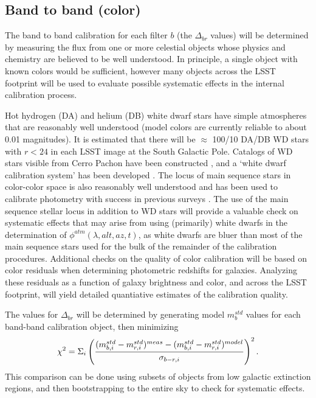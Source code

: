 \documentclass[12pt,preprint]{aastex}
\begin{document}
\subsection{Band to band (color)}

The band to band calibration for each filter $b$ (the $\Delta_{br}$
values) will be determined by measuring the flux from one or more
celestial objects whose physics and chemistry are believed to be well
understood. In principle, a single object with known colors would be
sufficient, however many objects across the LSST footprint
will be used to evaluate possible systematic effects in the internal
calibration process. 

Hot hydrogen (DA) and helium (DB) white dwarf stars have simple
atmospheres that are reasonably well understood (model colors are
currently reliable to about 0.01 magnitudes). It is estimated that
there will be $\approx$ 100/10 DA/DB WD stars with $r<24$ in each LSST
image at the South Galactic Pole. Catalogs of WD stars visible from
Cerro Pachon have been constructed \citep{1992JRASC..86..309B,
2004AJ....128.3053B}, and a `white dwarf calibration system' has been
developed \citep{2006AJ....132.1221H}. The locus of main sequence
stars in color-color space is also reasonably well understood and has
been used to calibrate photometry with success in previous surveys
\citep{2004MNRAS.352.1255M, 2007AJ....134..973I}. The use of the main
sequence stellar locus in addition to WD stars will provide a valuable
check on systematic effects that may arise from using (primarily)
white dwarfs in the determination of $\phi^{atm}(\lambda,alt,az,t)$,
as white dwarfs are bluer than most of the main sequence stars used
for the bulk of the remainder of the calibration procedures.
Additional checks on the quality of color calibration will be based on
color residuals when determining photometric redshifts for
galaxies. Analyzing these residuals as a function of galaxy brightness
and color, and across the LSST footprint, will yield detailed
quantiative estimates of the calibration quality.

The values for $\Delta_{br}$ will be determined by generating model
$m_b^{std}$ values for each band-band calibration object, then
minimizing 
\begin{equation}
\chi^2 = \Sigma_{i} \left( { (m_{b,i}^{std} - m_{r,i}^{std})^{meas} - (m_{b,i}^{std}
    - m_{r,i}^{std})^{model} \over  \sigma_{b-r,i}}\right) ^2. 
\end{equation}
This comparison can
be done using subsets of objects from low galactic extinction regions,
and then bootstrapping to the entire sky to check for systematic
effects. 
\end{document}
